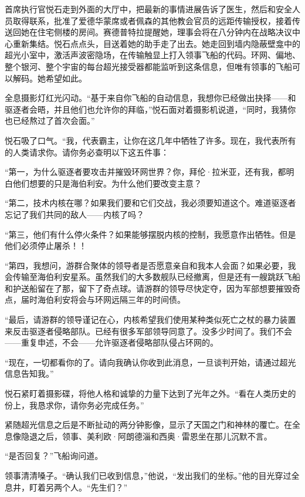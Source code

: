 \documentclass[AutoFakeBold=true]{book}
\begin{document}
首席执行官悦石走到外面的大厅中，把最新的事情进展告诉了医生，然后和安全人员取得联系，批准了爱德华蒙席或者佩森的其他教会官员的远距传输授权，接着传送回她在住宅侧楼的房间。赛德普特拉提醒她，理事会将在八分钟内在战略决议中心重新集结。悦石点点头，目送着她的助手走了出去。她走回到墙内隐蔽壁龛中的超光小室中，激活声波密隐场，在传输触显上打入领事飞船的代码。环网、偏地、整个银河、整个宇宙的每台超光接受器都能监听到这条信息，但唯有领事的飞船可以解码。她希望如此。

全息摄影灯红光闪动。``基于来自你飞船的自动信息，我想你已经做出抉择——和驱逐者会晤，并且他们也允许你的拜临，''悦石面对着摄影机说道，``同时，我猜你也已经熬过了首次会面。''

悦石吸了口气。``我，代表霸主，让你在这几年中牺牲了许多。现在，我代表所有的人类请求你。请你务必查明以下这五件事：

``第一，为什么驱逐者要攻击并摧毁环网世界？你，拜伦·拉米亚，还有我，都明白他们想要的只是海伯利安。为什么他们要改变主意？

``第二，技术内核在哪？如果我们要和它们交战，我必须要知道这个。难道驱逐者忘记了我们共同的敌人——内核了吗？

``第三，他们有什么停火条件？如果能够摆脱内核的控制，我愿意作出牺牲。但是他们必须停止屠杀！！

``第四，我想问，游群合聚体的领导者是否愿意亲自和我本人会面？如果必要，我会传输至海伯利安星系。虽然我们的大多数舰队已经撤离，但是还有一艘跳跃飞船和护送船留在了那，留下了奇点球。请游群的领导尽快定夺，因为军部想要摧毁奇点，届时海伯利安将会与环网远隔三年的时间债。

``最后，请游群的领导谨记在心，内核希望我们使用某种类似死亡之杖的暴力装置来反击驱逐者侵略部队。已经有很多军部领导同意了。没多少时间了。我们不会——重复申述，不会——允许驱逐者侵略部队侵占环网的。

``现在，一切都看你的了。请向我确认你收到此消息，一旦谈判开始，请通过超光信息告知我。''

悦石紧盯着摄影碟，将他人格和诚挚的力量下达到了光年之外。``看在人类历史的份上，我恳求你，请你务必完成任务。''

\vspace*{1em}

紧随超光信息之后是不断扯动的两分钟影像，显示了天国之门和神林的覆亡。在全息像隐退之后，领事、美利欧·阿朗德淄和西奥·雷恩坐在那儿沉默不言。

``是否回复？''飞船询问道。

领事清清嗓子。``确认我们已收到信息，''他说，``发出我们的坐标。''他的目光穿过全息井，盯着另两个人。``先生们？''
\end{document}
